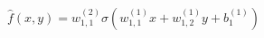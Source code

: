 \documentclass[preview]{standalone}
\begin{document}
\begin{align*}
\hat{f}(x,y) =  w_{1,1}^{(2)} \sigma(w_{1,1}^{(1)}x + w_{1,2}^{(1)}y +b_1^{(1)})
\end{align*}
\end{document}
